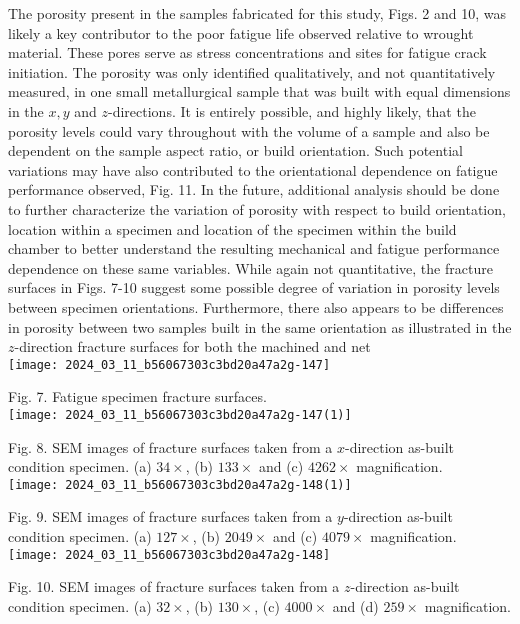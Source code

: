 \documentclass[10pt]{article}
\begin{document}
The porosity present in the samples fabricated for this study, Figs. 2 and 10, was likely a key contributor to the poor fatigue life observed relative to wrought material. These pores serve as stress concentrations and sites for fatigue crack initiation. The porosity was only identified qualitatively, and not quantitatively measured, in one small metallurgical sample that was built with equal dimensions in the $x, y$ and $z$-directions. It is entirely possible, and highly likely, that the porosity levels could vary throughout with the volume of a sample and also be dependent on the sample aspect ratio, or build orientation. Such potential variations may have also contributed to the orientational dependence on fatigue performance observed, Fig. 11. In the future, additional analysis should be done to further characterize the variation of porosity with respect to build orientation, location within a specimen and location of the specimen within the build chamber to better understand the resulting mechanical and fatigue performance dependence on these same variables. While again not quantitative, the fracture surfaces in Figs. 7-10 suggest some possible degree of variation in porosity levels between specimen orientations. Furthermore, there also appears to be differences in porosity between two samples built in the same orientation as illustrated in the $z$-direction fracture surfaces for both the machined and net\\
\texttt{[image: 2024\_03\_11\_b56067303c3bd20a47a2g-147]}

Fig. 7. Fatigue specimen fracture surfaces.\\
\texttt{[image: 2024\_03\_11\_b56067303c3bd20a47a2g-147(1)]}

Fig. 8. SEM images of fracture surfaces taken from a $x$-direction as-built condition specimen. (a) $34 \times$, (b) $133 \times$ and (c) $4262 \times$ magnification.\\
\texttt{[image: 2024\_03\_11\_b56067303c3bd20a47a2g-148(1)]}

Fig. 9. SEM images of fracture surfaces taken from a $y$-direction as-built condition specimen. (a) $127 \times$, (b) $2049 \times$ and (c) $4079 \times$ magnification.\\
\texttt{[image: 2024\_03\_11\_b56067303c3bd20a47a2g-148]}

Fig. 10. SEM images of fracture surfaces taken from a $z$-direction as-built condition specimen. (a) $32 \times$, (b) $130 \times$, (c) $4000 \times$ and (d) $259 \times$ magnification.
\end{document}
